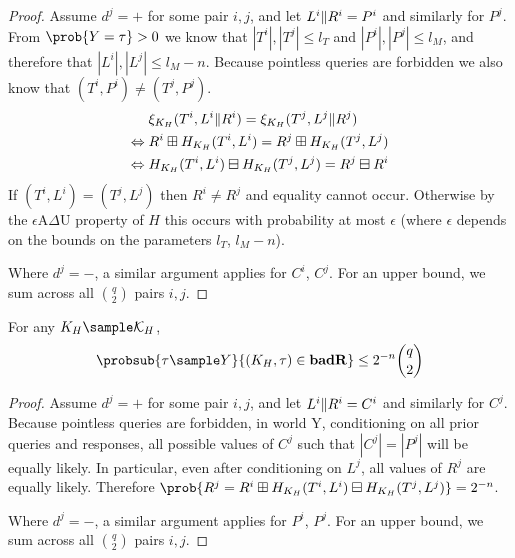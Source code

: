 \documentclass[eprint.tex]{subfiles}
\begin{document}
\begin{proof}
Assume $d^j = +$ for some pair $i, j$, and let $L^i \Vert R^i = P^i$ and similarly for $P^j$.
From $\prob{Y = \tau} > 0$ we know that $|T^i|, |T^j| \leq l_T$ and $|P^i|, |P^j| \leq l_M$,
and therefore that $|L^i|, |L^j| \leq l_M - n$.
Because pointless queries are forbidden we also know that $(T^i, P^i) \neq (T^j, P^j)$.
%
\begin{align*}
    {}&\xi_{K_H}(T^i, L^i \Vert R^i) = \xi_{K_H}(T^j, L^j \Vert R^j) \\
    \Leftrightarrow{}& R^i \boxplus H_{K_H}(T^i, L^i) = R^j \boxplus H_{K_H}(T^j, L^j) \\
    \Leftrightarrow{}& H_{K_H}(T^i, L^i) \boxminus H_{K_H}(T^j, L^j) = R^j \boxminus R^i \\
\end{align*}
%
If $(T^i, L^i) = (T^j, L^j)$ then $R^i \neq R^j$ and equality cannot occur.
Otherwise by the $\epsilon$A$\Delta$U property of $H$ this occurs with probability
at most $\epsilon$ (where $\epsilon$ depends on the bounds on
the parameters $l_T$, $l_M -n$).

Where $d^j = -$, a similar argument applies for $C^i$, $C^j$.
For an upper bound, we sum across all $\binom{q}{2}$ pairs $i, j$.
\end{proof}

\begin{lemma} \label{badR}
    For any $K_H \sample \mathcal{K}_H$,
    \begin{displaymath}
        \probsub{\tau \sample Y}{(K_H, \tau) \in \badR}
        \leq 2^{-n} \binom{q}{2}
    \end{displaymath}
\end{lemma}

\begin{proof}
    Assume $d^j = +$ for some pair $i, j$, and let $L^i \Vert R^i = C^i$ and similarly for $C^j$.
    Because pointless queries are forbidden, in world Y,
    conditioning on all prior queries and responses,
    all possible values of $C^j$ such that $|C^j| = |P^j|$ will be equally likely.
    In particular, even after conditioning on $L^j$,
    all values of $R^j$ are equally likely. Therefore
    $\prob{R^j = R^i \boxplus H_{K_H}(T^i, L^i) \boxminus H_{K_H}(T^j, L^j)} = 2^{-n}$.

    Where $d^j = -$, a similar argument applies for $P^i$, $P^j$.
    For an upper bound, we sum across all $\binom{q}{2}$ pairs $i, j$.
\end{proof}
\end{document}

